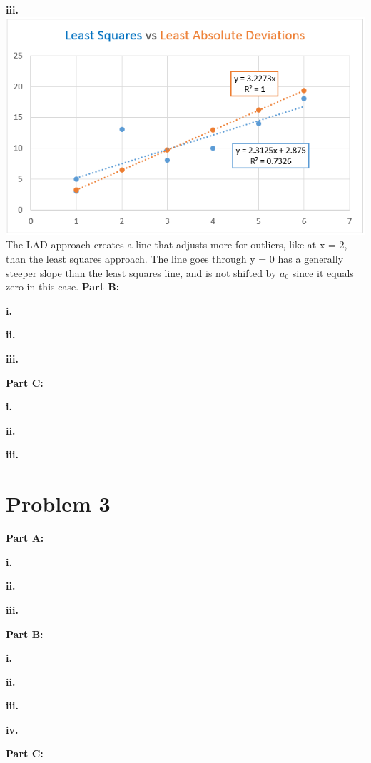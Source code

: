 \documentclass[paper=a4, fontsize=11pt]{scrartcl} %
\numberwithin{equation}{section} %
\numberwithin{figure}{section} %
\numberwithin{table}{section} %
\begin{document}
    \textbf{iii.}
    \includegraphics[width=\textwidth]{p3paiii}
    The LAD approach creates a line that adjusts more for outliers, like at x = 2, than the least squares approach. The line goes through y = 0 has a generally steeper slope than the least squares line, and is not shifted by $a_0$ since it equals zero in this case.\newline
\textbf{Part B:}
    
    \textbf{i.}
    
    \textbf{ii.}
    
    \textbf{iii.}
    
\textbf{Part C:}
	
    \textbf{i.}
    
    \textbf{ii.}
    
    \textbf{iii.}
    
\section{Problem 3}
\textbf{Part A:}

    \textbf{i.}
    
    \textbf{ii.}
    
    \textbf{iii.}
    
\textbf{Part B:}
    
    \textbf{i.}
    
    \textbf{ii.}
    
    \textbf{iii.}
    
    \textbf{iv.}
    
\textbf{Part C:}
	
\end{document}
